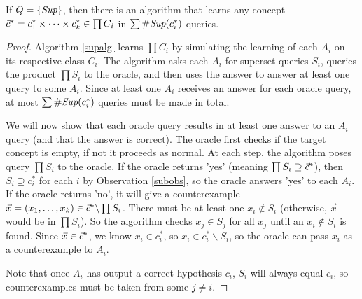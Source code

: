 \begin{proposition}

If $Q = \{ \supQ \}$, then there is an algorithm that learns any concept $\targ = c^*_1 \times \dots \times c^*_k  \in \prod C_i $ in $\sum \supCi{i}(c^*_i)$ queries.  
\end{proposition}
\begin{proof}
Algorithm \ref{supalg} learns $\prod C_i $ by simulating the learning of each $A_i$ on its respective class $C_i$. 
The algorithm asks each $A_i$ for superset queries $S_i$, queries the product $\prod S_i$ to the oracle, and then uses the answer to answer at least one query to some $A_i$. 
Since at least one $A_i$ receives an answer for each oracle query, at most $\sum \supCi{i}(c^*_i)$ queries must be made in total. 

 

We will now show that each oracle query results in at least one answer to an $A_i$ query (and that the answer is correct). 
The oracle first checks if the target concept is empty, if not it proceeds as normal.
At each step, the algorithm poses query $\prod S_i$ to the oracle. 
If the oracle returns 'yes' (meaning $\prod S_i \supseteq \targ$), then  $S_i \supseteq c_i^*$ for each $i$ by Observation \ref{subobs}, so the oracle answers 'yes' to each $A_i$. 
If the oracle returns 'no', it will give a counterexample $\vec{x} = (x_1,\dots,x_k) \in \targ \backslash \prod S_i$. 
There must be at least one $x_i \not\in S_i$ (otherwise, $\vec{x}$ would be in $\prod S_i$). 
So the algorithm checks $x_j \in S_j$ for all $x_j$ until an $x_i \not\in S_i$ is found. 
Since $\vec{x} \in \targ$, we know $x_i \in c_i^*$, so $x_i \in c_i^* \backslash S_i$, so the oracle can pass $x_i$ as a counterexample to $A_i$. 

Note that once $A_i$ has output a correct hypothesis $c_i$, $S_i$ will always equal $c_i$, so counterexamples must be taken from some $j \ne i$. 
\end{proof}





